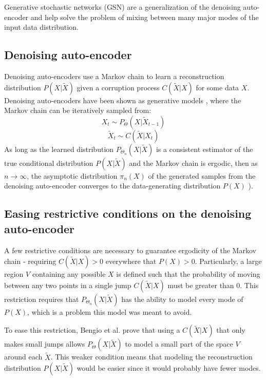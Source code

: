 Generative stochastic networks (GSN) are a generalization of the denoising auto-encoder and help solve the problem of mixing between many major modes of the input data distribution.

\subsection{Denoising auto-encoder}
Denoising auto-encoders use a Markov chain to learn a reconstruction distribution \(P(X|\widetilde{X})\) given a corruption process \(C(\widetilde{X}|X)\) for some data \(X\). Denoising auto-encoders have been shown as generative models \cite{bengio13a}, where the Markov chain can be iteratively sampled from:
\begin{equation}
	X_t \sim P_\Theta(X|\widetilde{X}_{t-1})
\end{equation}
\begin{equation}
	\widetilde{X}_t \sim C(\widetilde{X}|X_t)
\end{equation}
As long as the learned distribution \(P_{\Theta_n}(X|\widetilde{X})\) is a consistent estimator of the true conditional distribution \(P(X|\widetilde{X})\) and the Markov chain is ergodic, then as \(n \rightarrow \infty\), the asymptotic distribution \(\pi_n(X)\) of the generated samples from the denoising auto-encoder converges to the data-generating distribution \(P(X)\) \cite{bengio13a}). 


\subsection{Easing restrictive conditions on the denoising auto-encoder}

A few restrictive conditions are necessary to guarantee ergodicity of the Markov chain - requiring \(C(\widetilde{X}|X) > 0\) everywhere that \(P(X) > 0\). Particularly, a large region \(V\) containing any possible \(X\) is defined such that the probability of moving between any two points in a single jump \(C(\widetilde{X}|X)\) must be greater than 0. This restriction requires that \(P_{\Theta_n}(X|\widetilde{X})\) has the ability to model every mode of \(P(X)\), which is a problem this model was meant to avoid.

To ease this restriction, Bengio et al. \cite{gsn} prove that using a \(C(\widetilde{X}|X)\) that only makes small jumps allows \(P_{\Theta}(X|\widetilde{X})\) to model a small part of the space \(V\) around each \(\widetilde{X}\). This weaker condition means that modeling the reconstruction distribution \(P(X|\widetilde{X})\) would be easier since it would probably have fewer modes. 

